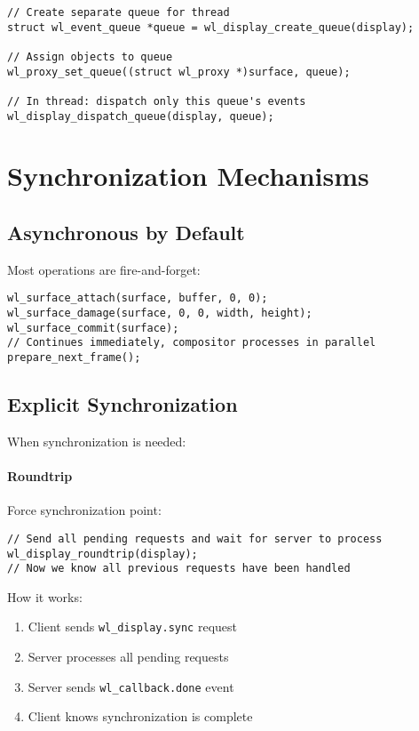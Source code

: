 \begin{lstlisting}[style=cstyle, caption=Event Queues]
// Create separate queue for thread
struct wl_event_queue *queue = wl_display_create_queue(display);

// Assign objects to queue
wl_proxy_set_queue((struct wl_proxy *)surface, queue);

// In thread: dispatch only this queue's events
wl_display_dispatch_queue(display, queue);
\end{lstlisting}

\section{Synchronization Mechanisms}

\subsection{Asynchronous by Default}

Most operations are fire-and-forget:

\begin{lstlisting}[style=cstyle, caption=Asynchronous Requests]
wl_surface_attach(surface, buffer, 0, 0);
wl_surface_damage(surface, 0, 0, width, height);
wl_surface_commit(surface);
// Continues immediately, compositor processes in parallel
prepare_next_frame();
\end{lstlisting}

\subsection{Explicit Synchronization}

When synchronization is needed:

\paragraph{Roundtrip}
Force synchronization point:
\begin{lstlisting}[style=cstyle, caption=Roundtrip]
// Send all pending requests and wait for server to process
wl_display_roundtrip(display);
// Now we know all previous requests have been handled
\end{lstlisting}

How it works:
\begin{enumerate}
    \item Client sends \texttt{wl\_display.sync} request
    \item Server processes all pending requests
    \item Server sends \texttt{wl\_callback.done} event
    \item Client knows synchronization is complete
\end{enumerate}


